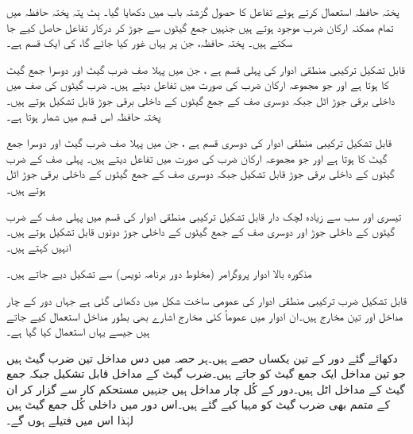 پختہ حافظہ استعمال کرتے ہوئے تفاعل کا حصول گزشتہ باب میں دکھایا گیا۔  بِٹ پتہ پختہ حافظہ میں تمام ممکنہ  ارکان ضرب موجود ہوتے ہیں جنہیں جمع گیٹوں سے جوڑ کر درکار تفاعل حاصل کیے جا سکتے ہیں۔ پختہ حافظہ، جن پر یہاں غور کیا جائے گا، کی ایک قسم ہے۔

قابل تشکیل ترکیبی منطقی ادوار کی پہلی قسم   ہے ، جن میں پہلا صف ضرب گیٹ اور دوسرا جمع گیٹ کا ہوتا ہے اور جو مجموعہ ارکان ضرب کی صورت میں تفاعل دیتے ہیں۔ ضرب گیٹوں کی صف میں داخلی برقی جوڑ اٹل جبکہ دوسری صف کے جمع گیٹوں کے داخلی برقی جوڑ قابل تشکیل ہوتے ہیں۔پختہ حافظہ اس قسم میں شمار ہوتا ہے۔

قابل تشکیل ترکیبی منطقی ادوار کی دوسری قسم   ہے ، جن میں پہلا صف ضرب گیٹ اور دوسرا جمع گیٹ کا ہوتا ہے اور جو مجموعہ ارکان ضرب کی صورت میں تفاعل دیتے ہیں۔ پہلی صف کے ضرب گیٹوں کے داخلی برقی جوڑ قابل تشکیل جبکہ دوسری صف کے جمع گیٹوں کے داخلی برقی جوڑ اٹل ہوتے ہیں۔

تیسری اور سب سے زیادہ لچک دار قابل تشکیل ترکیبی منطقی ادوار کی قسم میں پہلی صف کے ضرب گیٹوں کے داخلی جوڑ اور دوسری صف کے جمع گیٹوں کے داخلی جوڑ دونوں قابل تشکیل ہوتے ہیں۔انہیں کہتے ہیں۔

مذکورہ بالا ادوار پروگرامر (مخلوط دور برنامہ نویس) سے تشکیل دیے جاتے ہیں۔


قابل تشکیل ضرب ترکیبی منطقی ادوار کی عمومی ساخت شکل  میں دکھائی گئی ہے جہاں دور کے چار مداخل اور تین مخارج ہیں۔ان ادوار میں عموماً کئی مخارج اشارے بھی بطور مداخل استعمال کیے جاتے ہیں جیسے یہاں  استعمال کیا گیا ہے۔

دکھائے گئے دور کے تین یکساں حصے ہیں۔ہر حصہ میں دس مداخل تین ضرب گیٹ ہیں جو تین مداخل ایک جمع گیٹ کو جاتے ہیں۔ضرب گیٹ کے مداخل قابل تشکیل جبکہ جمع گیٹ کے مداخل اٹل ہیں۔دور کے کُل چار مداخل ہیں جنہیں مستحکم کار سے گزار کر ان کے متمم بھی ضرب گیٹ کو مہیا کیے گئے ہیں۔اس دور میں  داخلی کُل جمع گیٹ ہیں لہٰذا اس میں  فتیلے ہوں گے۔

